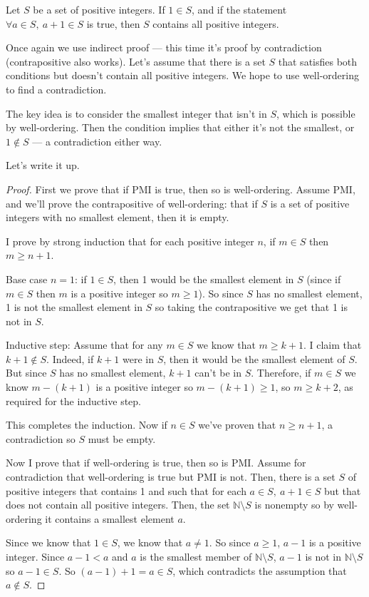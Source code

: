 \documentclass{amsart}
\newcommand{\Nn}{\mathbb{N}}
\begin{document}
Let $S$ be a set of positive integers. If $1\in S$, and if the statement
$\forall a\in S,\ a+1\in S$ is true, then $S$ contains all positive integers.

Once again we use indirect proof --- this time it's proof by contradiction
(contrapositive also works). Let's assume that there is a set $S$ that satisfies
both conditions but doesn't contain all positive integers. We hope to use
well-ordering to find a contradiction.

The key idea is to consider the smallest integer that isn't in $S$, which is
possible by well-ordering. Then the condition implies that either it's not the
smallest, or $1\not\in S$ --- a contradiction either way.

Let's write it up.
\begin{proof}
  First we prove that if PMI is true, then so is well-ordering. Assume PMI, and
  we'll prove the contrapositive of well-ordering: that if $S$ is a set of
  positive integers with no smallest element, then it is empty.

  I prove by strong induction that for each positive integer $n$, if $m\in S$
  then $m\ge n+1$.

  Base case $n=1$: if $1\in S$, then 1 would be the smallest element in $S$
  (since if $m\in S$ then $m$ is a positive integer so $m\ge 1$).
  So since $S$ has no smallest element, 1 is not the smallest element in $S$ so
  taking the contrapositive we get that 1 is not in $S$.

  Inductive step: Assume that for any $m\in S$ we know that $m\ge k+1$. I
  claim that $k+1\not\in S$. Indeed, if $k+1$ were in $S$, then it would be the
  smallest element of $S$. But since $S$ has no smallest element, $k+1$ can't be
  in $S$. Therefore, if $m\in S$ we know $m-(k+1)$ is a positive integer so
  $m-(k+1)\ge 1$, so $m\ge k+2$, as required for the inductive step.

  This completes the induction. Now if $n\in S$ we've proven that $n\ge n+1$, a
  contradiction so $S$ must be empty.

  Now I prove that if well-ordering is true, then so is PMI\@. Assume for
  contradiction that well-ordering is true but PMI is not. Then, there is a set
  $S$ of positive integers that contains 1 and such that for each $a\in S,\
  a+1\in S$ but that does not contain all positive integers. Then, the set
  $\Nn\setminus S$ is nonempty so by well-ordering it contains a smallest
  element $a$.

  Since we know that $1\in S$, we know that $a\ne 1$. So since $a\ge 1$,
  $a-1$ is a positive
  integer. Since $a-1<a$ and $a$ is the smallest member of $\Nn\setminus S$,
  $a-1$ is not in $\Nn\setminus S$ so $a-1\in S$. So $(a-1)+1=a\in S$,
  which contradicts the assumption that $a\not\in S$.
\end{proof}
\end{document}
